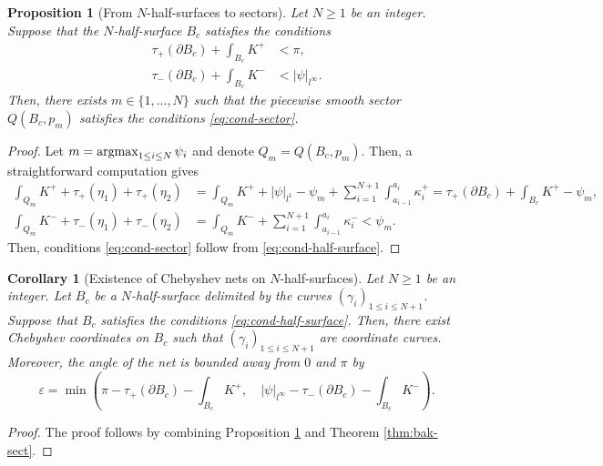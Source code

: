 \documentclass{article}
\newcommand{\argmax}{\operatornamewithlimits{argmax}}
\newcommand{\ko}{\kappa}
\newcommand{\sect}{Q}
\newcommand{\halfP}{B}
\newcommand{\psim}{|\psi|_{l^\infty}}
\newcommand{\psitot}{|\psi|_{l^1}}
\newtheorem{proposition}[theorem]{Proposition}
\newtheorem{corollaryE}[theorem]{Corollary}
\theoremstyle{remark}
\theoremstyle{prpart}
\begin{document}
\begin{proposition}[From $N$-half-surfaces to sectors]  \label{prop:half-surface-to-sector}
  Let $N\geq 1$ be an integer. Suppose that the $N$-half-surface $\halfP_c$ satisfies the conditions
  \begin{subequations}\label{eq:cond-half-surface}
    \begin{alignat}{2}  \label{eq:cond-half-surface1}
      \tau_+(\partial \halfP_c) + \int_{\halfP_c} K^+ &< \pi,  \\
      \tau_-(\partial \halfP_c) + \int_{\halfP_c} K^-  &< \psim. \label{eq:cond-half-surface2}
  \end{alignat}
\end{subequations}
Then, there exists $m\in\{1,...,N\}$ such that the piecewise smooth sector $\sect(\halfP_c,p_m)$ satisfies the conditions \eqref{eq:cond-sector}.
\end{proposition}
\begin{proof}
  Let $m = \argmax_{1\leq i\leq N} \psi_i$ and denote $\sect_m = \sect(\halfP_c,p_m)$. Then, a straightforward computation gives
\begin{align*}
\int_{\sect_m} K^+ + \tau_+(\eta_1) + \tau_+(\eta_2) &= \int_{\sect_m} K^+ + \psitot - \psi_m + \sum_{i=1}^{N+1}\int_{a_{i-1}}^{a_{i}}\ko_i^+ =  \tau_+(\partial \halfP_c) + \int_{\halfP_c} K^+ - \psi_m,\\
\int_{\sect_m} K^- + \tau_-(\eta_1) + \tau_-(\eta_2) &= \int_{\sect_m} K^- + \sum_{i=1}^{N+1}\int_{a_{i-1}}^{a_{i}}\ko_i^- <\psi_m.
\end{align*}
Then, conditions \eqref{eq:cond-sector} follow from \eqref{eq:cond-half-surface}.
\end{proof}
\begin{corollaryE}[Existence of Chebyshev nets on $N$-half-surfaces]  \label{cor:cheb-half-surface2}
  Let $N\geq 1$ be an integer. Let $\halfP_c$ be a $N$-half-surface delimited by the curves $(\gamma_i)_{1\leq i\leq N+1}$. Suppose that $\halfP_c$ satisfies the conditions \eqref{eq:cond-half-surface}.
Then, there exist Chebyshev coordinates on $\halfP_c$ such that $(\gamma_i)_{1\leq i\leq N+1}$ are coordinate curves. Moreover, the angle of the net is bounded away from $0$ and $\pi$ by 
\begin{equation}\label{eq:bound-max-angles}
\varepsilon=\min\left(\pi-\tau_+(\partial \halfP_c)-\int_{\halfP_c} K^+,\quad\psim-\tau_-(\partial \halfP_c) - \int_{\halfP_c} K^-\right).
\end{equation}
\end{corollaryE}
\begin{proof}
  The proof follows by combining Proposition \ref{prop:half-surface-to-sector} and Theorem \ref{thm:bak-sect}.
\end{proof}
\end{document}
